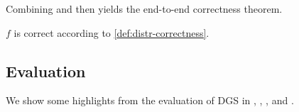 


Combining 
and  then yields the end-to-end correctness theorem.

\begin{theorem}
\label{theorem:correctness}
$f$ is correct according to \cref{def:distr-correctness}.
\end{theorem}



\subsection{Evaluation}

We show some highlights from the evaluation of DGS
in ,
,
,
and .

